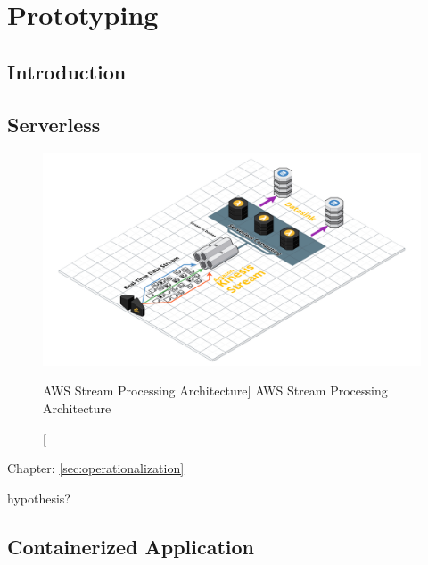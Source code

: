 \chapter{Prototyping}


\section{Introduction}


\section{Serverless}

\begin{figure}[ht]
    \includegraphics[width=\linewidth]{images/streaming/streamingaws.png}\centering
    \caption
    [AWS Stream Processing Architecture]
    {AWS Stream Processing Architecture}
    \label{fig:awsStreamingArchitecture}
\end{figure}

Chapter: \ref{sec:operationalization}

hypothesis?


\section{Containerized Application}

